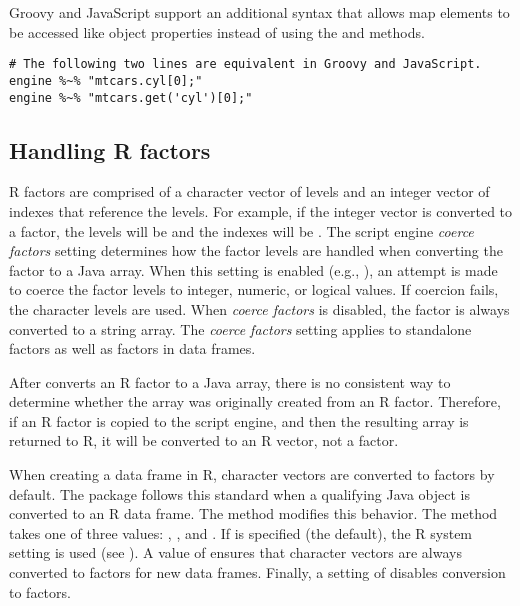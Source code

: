 Groovy and JavaScript support an additional syntax that allows map elements to be accessed like object properties instead of using the  and  methods.

\begin{verbatim}
# The following two lines are equivalent in Groovy and JavaScript.
engine %~% "mtcars.cyl[0];"
engine %~% "mtcars.get('cyl')[0];"
\end{verbatim}

\subsection{Handling R factors}

R factors are comprised of a character vector of levels and an integer vector of indexes that reference the levels. For example, if the integer vector  is converted to a factor, the levels will be  and the indexes will be . The script engine \textit{coerce factors} setting determines how the factor levels are handled when converting the factor to a Java array. When this setting is enabled (e.g., ), an attempt is made to coerce the factor levels to integer, numeric, or logical values. If coercion fails, the character levels are used. When \textit{coerce factors} is disabled, the factor is always converted to a string array. The \textit{coerce factors} setting applies to standalone factors as well as factors in data frames.

After  converts an R factor to a Java array, there is no consistent way to determine whether the array was originally created from an R factor. Therefore, if an R factor is copied to the script engine, and then the resulting array is returned to R, it will be converted to an R vector, not a factor.

When creating a data frame in R, character vectors are converted to factors by default. The  package follows this standard when a qualifying Java object is converted to an R data frame. The  method modifies this behavior. The method takes one of three values: , , and . If  is specified (the default), the R system setting is used (see \newline{}). A value of  ensures that character vectors are always converted to factors for new data frames. Finally, a setting of  disables conversion to factors.

